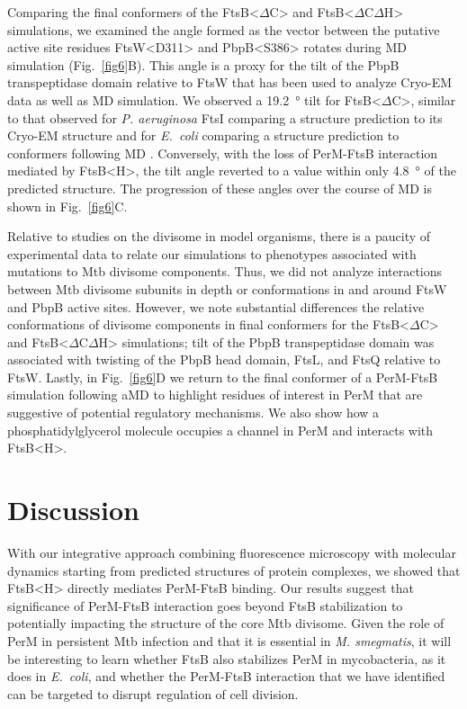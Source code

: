 \documentclass[pdflatex,sn-nature]{sn-jnl}%
\def\textsuperscript#1{<#1>}%
\newcommand\ec{\textit{E.~coli}}
\newcommand\mtb{Mtb}
\newcommand\msmeg{\textit{M. smegmatis}}
\newcommand\pa{\textit{P. aeruginosa}}
\newcommand\ftsbH{FtsB\textsuperscript{H}}
\newcommand\ftsbdCdH{FtsB\textsuperscript{$\Delta{}$C$\Delta{}$H}}
\newcommand\ftsbdC{FtsB\textsuperscript{$\Delta{}$C}}
\begin{document}
Comparing the final conformers of the \ftsbdC{} and \ftsbdCdH{} simulations, we examined the angle formed as the vector between the putative active site residues FtsW\textsuperscript{D311} and PbpB\textsuperscript{S386} rotates during MD simulation (Fig.~\ref{fig6}B).
This angle is a proxy for the tilt of the PbpB transpeptidase domain relative to FtsW that has been used to analyze Cryo-EM data as well as MD simulation.
We observed a \qty{19.2}{\degree} tilt for \ftsbdC{}, similar to that observed for \pa{} FtsI comparing a structure prediction to its Cryo-EM structure \citep{kashammerCryoEMStructureBacterial2023} and for \ec{} comparing a structure prediction to conformers following MD \citep{brittonConformationalChangesEssential2023}.
Conversely, with the loss of PerM-FtsB interaction mediated by \ftsbH{}, the tilt angle reverted to a value within only \qty{4.8}{\degree} of the predicted structure.
The progression of these angles over the course of MD is shown in Fig.~\ref{fig6}C.

Relative to studies on the divisome in model organisms, there is a paucity of experimental data to relate our simulations to phenotypes associated with mutations to \mtb{} divisome components.
Thus, we did not analyze interactions between \mtb{} divisome subunits in depth or conformations in and around FtsW and PbpB active sites.
However, we note substantial differences the relative conformations of divisome components in final conformers for the \ftsbdC{} and \ftsbdCdH{} simulations; tilt of the PbpB transpeptidase domain was associated with twisting of the PbpB head domain, FtsL, and FtsQ relative to FtsW.
Lastly, in Fig.~\ref{fig6}D we return to the final conformer of a PerM-FtsB simulation following aMD to highlight residues of interest in PerM that are suggestive of potential regulatory mechanisms.
We also show how a phosphatidylglycerol molecule occupies a channel in PerM and interacts with \ftsbH{}.

\section{Discussion}

With our integrative approach combining fluorescence microscopy with molecular dynamics starting from predicted structures of protein complexes, we showed that \ftsbH{} directly mediates PerM-FtsB binding.
Our results suggest that significance of PerM-FtsB interaction goes beyond FtsB stabilization \citep{wangPersistentMycobacteriumTuberculosis2019} to potentially impacting the structure of the core \mtb{} divisome.
Given the role of PerM in persistent \mtb{} infection and that it is essential in \msmeg{}, it will be interesting to learn whether FtsB also stabilizes PerM in mycobacteria, as it does in \ec{}, and whether the PerM-FtsB interaction that we have identified can be targeted to disrupt regulation of cell division.
\end{document}
